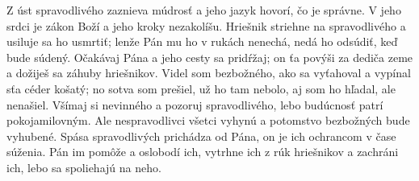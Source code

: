\versseparator
Z úst spravodlivého zaznieva múdrosť
a jeho jazyk hovorí, čo je správne.
\versseparator
V jeho srdci je zákon Boží
a jeho kroky nezakolíšu.
\versseparator
Hriešnik striehne na spravodlivého
a usiluje sa ho usmrtiť;
\versseparator
lenže Pán mu ho v rukách nenechá,
nedá ho odsúdiť, keď bude súdený.
\versseparator
Očakávaj Pána a jeho cesty sa pridŕžaj;
on ťa povýši za dediča zeme
a dožiješ sa záhuby hriešnikov.
\versseparator
Videl som bezbožného, ako sa vyťahoval
a vypínal sťa céder košatý;
\versseparator
no sotva som prešiel, už ho tam nebolo,
aj som ho hľadal, ale nenašiel.
\versseparator
Všímaj si nevinného a pozoruj spravodlivého,
lebo budúcnosť patrí pokojamilovným.
\versseparator
Ale nespravodlivci všetci vyhynú
a potomstvo bezbožných bude vyhubené.
\versseparator
Spása spravodlivých prichádza od Pána,
on je ich ochrancom v čase súženia.
\versseparator
Pán im pomôže a oslobodí ich,
vytrhne ich z rúk hriešnikov a zachráni ich,
lebo sa spoliehajú na neho.